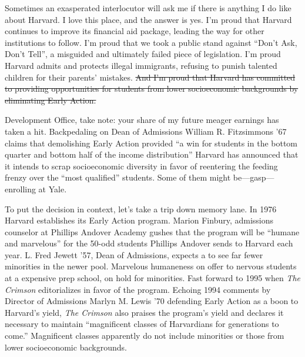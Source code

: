 

Sometimes an exasperated interlocutor will ask me if there is anything I do
like about Harvard. I love this place, and the answer is yes. I'm proud that
Harvard continues to improve its financial aid package, leading the way for
other institutions to follow. I'm proud that we took a public stand against
``Don't Ask, Don't Tell'', a misguided and ultimately failed piece of
legislation. I'm proud Harvard admits and protects illegal immigrants,
refusing to punish talented children for their parents' mistakes. \sout{And
I'm proud that Harvard has committed to providing opportunities for students
from lower socioeconomic backgrounds by eliminating Early Action.}

Development Office, take note: your share of my future meager earnings has
taken a hit. Backpedaling on Dean of Admissions William R. Fitzsimmons ’67
claims that demolishing Early Action provided ``a win for students in the
bottom quarter and bottom half of the income distribution'' Harvard has
announced that it intends to scrap socioeconomic diversity in favor of
reentering the feeding frenzy over the ``most qualified'' students. Some of
them might be---gasp---enrolling at Yale.

To put the decision in context, let's take a trip down memory lane. In 1976
Harvard establishes its Early Action program. Marion Finbury, admissions
counselor at Phillips Andover Academy gushes that the program will be
``humane and marvelous'' for the 50-odd students Phillips Andover sends to
Harvard each year. L. Fred Jewett '57, Dean of Admissions, expects a to see
far fewer minorities in the newer pool. Marvelous humaneness on offer to
nervous students at a expensive prep school, on hold for minorities. Fast
forward to 1995 when  \textit{The Crimson} editorializes in favor of the
program. Echoing 1994 comments by Director of Admissions Marlyn M. Lewis '70
defending Early Action as a boon to Harvard's yield, \textit{The Crimson}
also praises the program's yield and declares it necessary to maintain
``magnificent classes of Harvardians for generations to come.'' Magnificent
classes apparently do not include minorities or those from lower
socioeconomic backgrounds.

